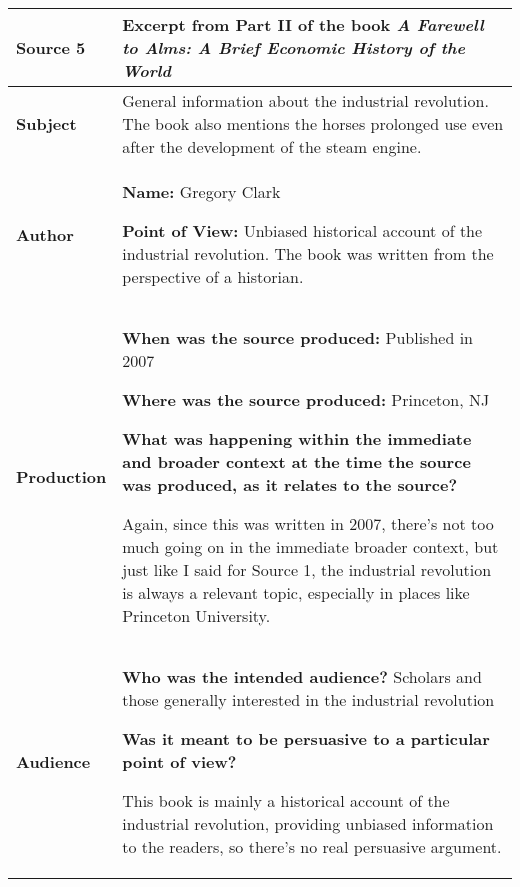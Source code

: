 {\renewcommand{\arraystretch}{2}
\begin{longtable}{ | p{3cm} | p{13cm} | }
\hline

\textbf{Source 5} &
Excerpt from Part II of the book \emph{A Farewell to Alms: A Brief Economic History of the World}
\\\hline

\textbf{Subject} &
General information about the industrial revolution.  The book also mentions the horses prolonged use even after the development of the steam engine.
\\\hline

\textbf{Author} &
\textbf{Name:} Gregory Clark \n

\textbf{Point of View:} Unbiased historical account of the industrial revolution.  The book was written from the perspective of a historian.
\\\hline

\textbf{Production} &
\textbf{When was the source produced:} Published in 2007

\textbf{Where was the source produced:} Princeton, NJ \n

\textbf{What was happening within the immediate and broader context at the time the source was produced, as it relates to the source? } \n

Again, since this was written in 2007, there's not too much going on in the immediate broader context, but just like I said for Source 1, the industrial revolution is always a relevant topic, especially in places like Princeton University.
\\\hline

\textbf{Audience} &
\textbf{Who was the intended audience?} Scholars and those generally interested in the industrial revolution \n 

\textbf{Was it meant to be persuasive to a particular point of view? } \n

This book is mainly a historical account of the industrial revolution, providing unbiased information to the readers, so there's no real persuasive argument.
\\\hline
\end{longtable}}